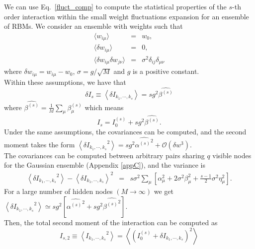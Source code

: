 \documentclass[11pt,letterpaper]{article}
\begin{document}
We can use Eq.~\eqref{fluct_comp} to compute the statistical properties of the $s$-th order interaction within the small weight fluctuations expansion for an ensemble of RBMs. We consider an ensemble with weights such that
\begin{eqnarray*}
    \langle w_{i\mu} \rangle &=& w_0,\\
    \langle \delta w_{i\mu} \rangle &=& 0,\\
    \langle \delta w_{i\mu} \delta w_{j\nu} \rangle &=& \sigma^2 \delta_{ij} \delta_{\mu\nu}
\end{eqnarray*}
where $\delta w_{i\mu}=w_{i\mu}-w_0$, $\sigma = g/\sqrt{M}$ and $g$ is a positive constant.\\
Within these assumptions, we have that
\begin{equation*}
   \delta I_s \equiv \left\langle \delta I_{k_{1},\cdots,k_{s}}\right\rangle = sg^{2}\widehat{\beta^{(s)}}
\end{equation*}
where $\widehat{\beta^{(s)}} = \frac{1}{M} \sum_{\mu}\beta_{\mu}^{(s)}$ which means 
\begin{equation}
    I_s= I_{0}^{(s)} + sg^2\widehat{\beta^{(s)}}.
    \label{expected}
\end{equation}
Under the same assumptions, the covariances can be computed, and the second moment takes the form
$\left\langle {\delta I_{k_{1},\cdots,k_{s}}}^2 \right\rangle
    =  sg^2 {\widehat{{\alpha^{(s)}}^{2}}} + \mathcal{O}(\delta w^3)$.\\
The covariances can be computed between arbitrary pairs sharing $q$ visible nodes for the Gaussian ensemble (Appendix \ref{appC}), and the variance is
\begin{eqnarray}
    \left\langle \delta {I_{k_{1},\cdots,k_{s}}}^{2}  \right\rangle-\left\langle \delta {I_{k_{1},\cdots,k_{s}}}  \right\rangle^2 & = & s\sigma^{2} \sum_{\mu} \left[  \alpha_{\mu}^{2} + 2\sigma^{2}\beta_{\mu}^{2} + \frac{s-1}{2}\sigma^{2}\eta_{\mu}^{2}\right].
    \label{eq:variance_fluct}
\end{eqnarray}
For a large number of hidden nodes $(M\to \infty)$  we get $\left\langle {\delta I_{k_{1},\cdots,k_{s}}}^{2}  \right\rangle \simeq sg^{2} \left[{\widehat{{\alpha^{(s)}}^{2}}} + sg^{2}{\widehat{{\beta^{(s)}}^{2}}}\right].$\\
Then, the total second moment of the interaction can be computed as 
\begin{equation}
    I_{s,2}\equiv \left\langle {I_{k_{1},\cdots,k_{s}}}^2 \right\rangle = \left\langle \left(I_0^{(s)} + \delta I_{k_1,\cdots, k_s}\right)^2\right\rangle
    \label{moment2}
\end{equation}
\end{document}
